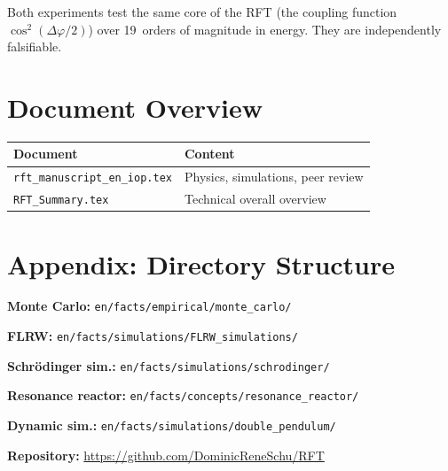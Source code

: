 \documentclass[a4paper,11pt]{article}
\begin{document}
	Both experiments test the same core of the RFT
	(the coupling function $\cos^2(\Delta\varphi/2)$) over
	19~orders of magnitude in energy. They are
	independently falsifiable.
	
	\section*{Document Overview}
	
	\begin{center}
		\begin{tabular}{ll}
			\hline
			\textbf{Document} & \textbf{Content} \\
			\hline
			\texttt{rft\_manuscript\_en\_iop.tex}
			& Physics, simulations, peer review \\
			\texttt{RFT\_Summary.tex}
			& Technical overall overview \\
			\hline
		\end{tabular}
	\end{center}
	
	\section*{Appendix: Directory Structure}
	
	\textbf{Monte Carlo:}
	\texttt{en/facts/empirical/monte\_carlo/}
	
	\textbf{FLRW:}
	\texttt{en/facts/simulations/FLRW\_simulations/}
	
	\textbf{Schr\"odinger sim.:}
	\texttt{en/facts/simulations/schrodinger/}
	
	\textbf{Resonance reactor:}
	\texttt{en/facts/concepts/resonance\_reactor/}
	
	\textbf{Dynamic sim.:}
	\texttt{en/facts/simulations/double\_pendulum/}
	
	\vspace{2em}
	
	\textbf{Repository:}
	\url{https://github.com/DominicReneSchu/RFT}
	\hfill
	
\end{document}
